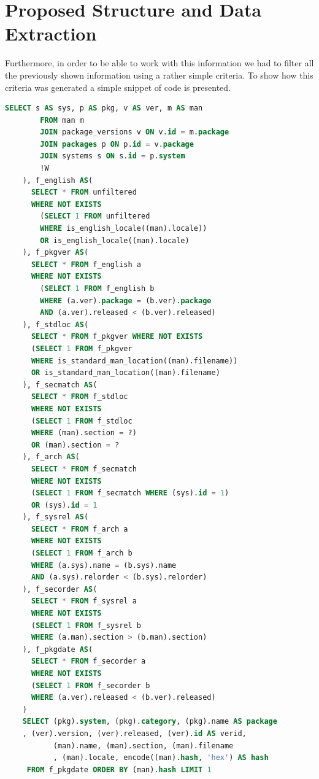 \section{Proposed Structure and Data Extraction}
Furthermore, in order to be able to work with this information we had to filter all the previously shown information using a rather simple criteria. To show how this criteria was generated a simple snippet of code is presented.

\begin{lstlisting}[language=SQL, frame=single, basicstyle=\small\ttfamily]
SELECT s AS sys, p AS pkg, v AS ver, m AS man
        FROM man m
        JOIN package_versions v ON v.id = m.package
        JOIN packages p ON p.id = v.package
        JOIN systems s ON s.id = p.system
        !W
    ), f_english AS(
      SELECT * FROM unfiltered
      WHERE NOT EXISTS
        (SELECT 1 FROM unfiltered 
        WHERE is_english_locale((man).locale)) 
        OR is_english_locale((man).locale)
    ), f_pkgver AS(
      SELECT * FROM f_english a 
      WHERE NOT EXISTS
        (SELECT 1 FROM f_english b 
        WHERE (a.ver).package = (b.ver).package 
        AND (a.ver).released < (b.ver).released)
    ), f_stdloc AS(
      SELECT * FROM f_pkgver WHERE NOT EXISTS
      (SELECT 1 FROM f_pkgver 
      WHERE is_standard_man_location((man).filename)) 
      OR is_standard_man_location((man).filename)
    ), f_secmatch AS(
      SELECT * FROM f_stdloc 
      WHERE NOT EXISTS
      (SELECT 1 FROM f_stdloc 
      WHERE (man).section = ?) 
      OR (man).section = ?
    ), f_arch AS(
      SELECT * FROM f_secmatch 
      WHERE NOT EXISTS
      (SELECT 1 FROM f_secmatch WHERE (sys).id = 1) 
      OR (sys).id = 1
    ), f_sysrel AS(
      SELECT * FROM f_arch a 
      WHERE NOT EXISTS
      (SELECT 1 FROM f_arch b 
      WHERE (a.sys).name = (b.sys).name 
      AND (a.sys).relorder < (b.sys).relorder)
    ), f_secorder AS(
      SELECT * FROM f_sysrel a 
      WHERE NOT EXISTS
      (SELECT 1 FROM f_sysrel b 
      WHERE (a.man).section > (b.man).section)
    ), f_pkgdate AS(
      SELECT * FROM f_secorder a 
      WHERE NOT EXISTS
      (SELECT 1 FROM f_secorder b 
      WHERE (a.ver).released < (b.ver).released)
    )
    SELECT (pkg).system, (pkg).category, (pkg).name AS package
    , (ver).version, (ver).released, (ver).id AS verid,
           (man).name, (man).section, (man).filename
           , (man).locale, encode((man).hash, 'hex') AS hash
     FROM f_pkgdate ORDER BY (man).hash LIMIT 1
\end{lstlisting}

